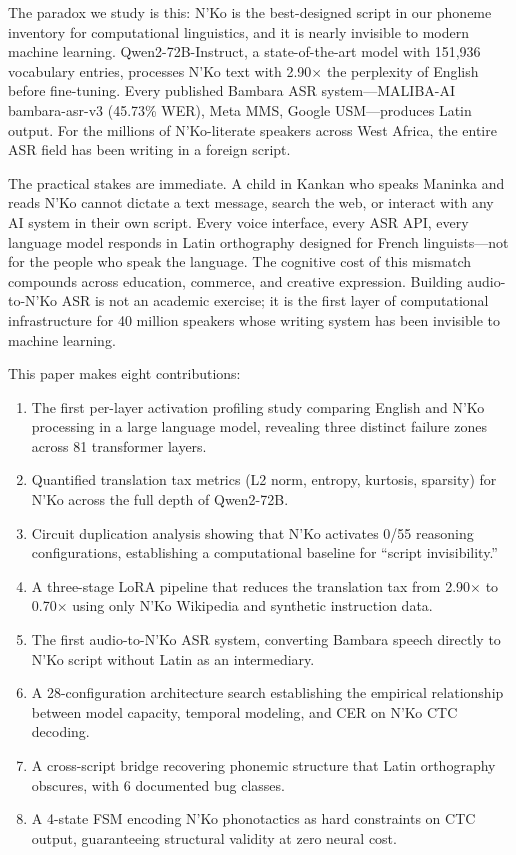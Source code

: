 \documentclass[11pt]{article}
\begin{document}
The paradox we study is this: N'Ko is the best-designed script in our phoneme inventory for computational linguistics, and it is nearly invisible to modern machine learning.
Qwen2-72B-Instruct, a state-of-the-art model with 151,936 vocabulary entries, processes N'Ko text with 2.90$\times$ the perplexity of English before fine-tuning.
Every published Bambara ASR system---MALIBA-AI bambara-asr-v3 (45.73\% WER), Meta MMS, Google USM---produces Latin output.
For the millions of N'Ko-literate speakers across West Africa, the entire ASR field has been writing in a foreign script.

The practical stakes are immediate.
A child in Kankan who speaks Maninka and reads N'Ko cannot dictate a text message, search the web, or interact with any AI system in their own script.
Every voice interface, every ASR API, every language model responds in Latin orthography designed for French linguists---not for the people who speak the language.
The cognitive cost of this mismatch compounds across education, commerce, and creative expression.
Building audio-to-N'Ko ASR is not an academic exercise; it is the first layer of computational infrastructure for 40 million speakers whose writing system has been invisible to machine learning.

This paper makes eight contributions:

\begin{enumerate}
\item The first per-layer activation profiling study comparing English and N'Ko processing in a large language model, revealing three distinct failure zones across 81 transformer layers.
\item Quantified translation tax metrics (L2 norm, entropy, kurtosis, sparsity) for N'Ko across the full depth of Qwen2-72B.
\item Circuit duplication analysis showing that N'Ko activates 0/55 reasoning configurations, establishing a computational baseline for ``script invisibility.''
\item A three-stage LoRA pipeline that reduces the translation tax from 2.90$\times$ to 0.70$\times$ using only N'Ko Wikipedia and synthetic instruction data.
\item The first audio-to-N'Ko ASR system, converting Bambara speech directly to N'Ko script without Latin as an intermediary.
\item A 28-configuration architecture search establishing the empirical relationship between model capacity, temporal modeling, and CER on N'Ko CTC decoding.
\item A cross-script bridge recovering phonemic structure that Latin orthography obscures, with 6 documented bug classes.
\item A 4-state FSM encoding N'Ko phonotactics as hard constraints on CTC output, guaranteeing structural validity at zero neural cost.
\end{enumerate}
\end{document}
